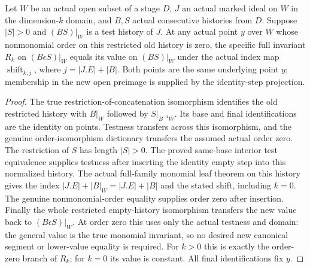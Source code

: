 \begin{lemma}
\label{hir:original-restricted-interior-monomial-leaf}
\leanok
{}
Let $W$ be an actual open subset of a stage $D$, $J$ an actual marked
ideal on $W$ in the dimension-$k$ domain, and $B,S$ actual consecutive
histories from $D$.  Suppose $|S|>0$ and $(BS)|_W$ is a test history of
$J$.  At any actual point $y$ over $W$ whose nonmonomial order on this
restricted old history is zero, the specific full invariant $R_k$ on
$(B\epsilon S)|_W$ equals its value on $(BS)|_W$ under the actual
index map $\operatorname{shift}_{k,j}$, where
$j=|J.E|+|B|$.  Both points are the same underlying point $y$; membership
in the new open preimage is supplied by the identity-step projection.
\end{lemma}
\begin{proof}
The true restriction-of-concatenation isomorphism identifies the old
restricted history with $B|_W$ followed by
$S|_{B^{-1}W}$.  Its base and final identifications are the identity on
points.  Testness transfers across this isomorphism, and the genuine
order-isomorphism dictionary transfers the assumed actual order zero.
The restriction of $S$ has length $|S|>0$.  The proved same-base interior
test equivalence supplies testness after inserting the identity empty
step into this normalized history.  The actual full-family monomial
leaf theorem on this history gives the index
$|J.E|+|B|_W=|J.E|+|B|$ and the stated shift, including $k=0$.
The genuine nonmonomial-order equality supplies order zero after insertion.
Finally the whole restricted empty-history isomorphism transfers the
new value back to $(B\epsilon S)|_W$.  At order zero this uses only the
actual testness and domain: the general value is the true monomial
invariant, so no desired new canonical segment or lower-value equality
is required.  For $k>0$ this is exactly the order-zero branch of $R_k$;
for $k=0$ its value is constant.  All final identifications fix $y$.
\end{proof}

